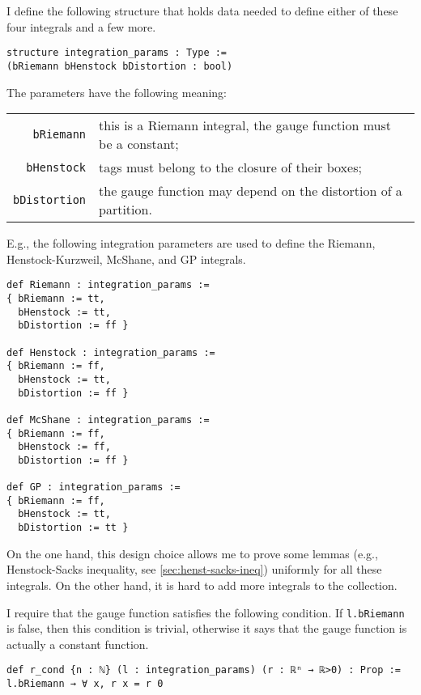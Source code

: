 \documentclass[a4paper,UKenglish,cleveref, autoref, thm-restate]{lipics-v2021}
\begin{document}
I define the following structure that holds data needed to define
either of these four integrals and a few more.

\begin{lstlisting}
structure integration_params : Type :=
(bRiemann bHenstock bDistortion : bool)
\end{lstlisting}

The parameters have the following meaning:

\noindent%
\begin{tabular}{rp{10cm}}
  \lstinline=bRiemann=&this is a Riemann integral, the gauge function must be a constant;\\
  \lstinline=bHenstock=&tags must belong to the closure of their boxes;\\
  \lstinline=bDistortion=&the gauge function may depend on the distortion of a partition.
\end{tabular}

E.g., the following integration parameters are used to define the
Riemann, Henstock-Kurzweil, McShane, and GP integrals.
\begin{lstlisting}[caption={Parameters corresponding to well-known integrals}]
def Riemann : integration_params :=
{ bRiemann := tt,
  bHenstock := tt,
  bDistortion := ff }

def Henstock : integration_params :=
{ bRiemann := ff,
  bHenstock := tt,
  bDistortion := ff }

def McShane : integration_params :=
{ bRiemann := ff,
  bHenstock := ff,
  bDistortion := ff }

def GP : integration_params :=
{ bRiemann := ff,
  bHenstock := tt,
  bDistortion := tt }
\end{lstlisting}

On the one hand, this design choice allows me to prove some lemmas
(e.g., Henstock-Sacks inequality, see \autoref{sec:henst-sacks-ineq})
uniformly for all these integrals. On the other hand, it is hard to
add more integrals to the collection.

I require that the gauge function satisfies the following
condition. If \lstinline=l.bRiemann= is false, then this condition is
trivial, otherwise it says that the gauge function is actually a
constant function.

\begin{lstlisting}[caption={Condition on the gauge function}]
def r_cond {n : ℕ} (l : integration_params) (r : ℝⁿ → ℝ>0) : Prop :=
l.bRiemann → ∀ x, r x = r 0
\end{lstlisting}
\end{document}
